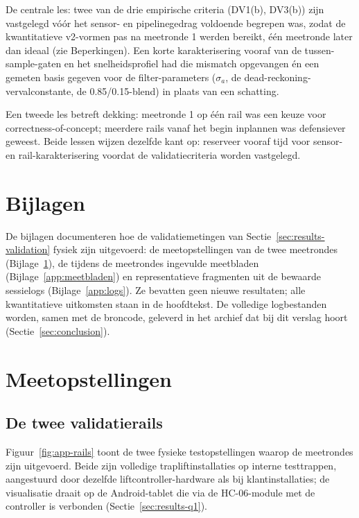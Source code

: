 \documentclass[10pt, a4paper, twocolumn]{article}
\begin{document}
De centrale les: twee van de drie empirische criteria (DV1(b), DV3(b)) zijn
vastgelegd vóór het sensor- en pipelinegedrag voldoende begrepen was, zodat de
kwantitatieve v2-vormen pas na meetronde 1 werden bereikt, één meetronde later dan
ideaal (zie Beperkingen). Een korte karakterisering vooraf van de
tussen-sample-gaten en het snelheidsprofiel had die mismatch opgevangen én een
gemeten basis gegeven voor de filter-parameters ($\sigma_a$, de
dead-reckoning-vervalconstante, de 0.85/0.15-blend) in plaats van een schatting.

Een tweede les betreft dekking: meetronde 1 op één rail was een keuze voor
correctness-of-concept; meerdere rails vanaf het begin inplannen was defensiever
geweest. Beide lessen wijzen dezelfde kant op: reserveer vooraf tijd voor sensor-
en rail-karakterisering voordat de validatiecriteria worden vastgelegd.

\clearpage



\clearpage
\onecolumn
\appendix

\section*{Bijlagen}
De bijlagen documenteren hoe de validatiemetingen van
Sectie~\ref{sec:results-validation} fysiek zijn uitgevoerd: de meetopstellingen
van de twee meetrondes (Bijlage~\ref{app:opstellingen}), de tijdens de meetrondes
ingevulde meetbladen (Bijlage~\ref{app:meetbladen}) en representatieve
fragmenten uit de bewaarde sessielogs (Bijlage~\ref{app:logs}). Ze bevatten
geen nieuwe resultaten; alle kwantitatieve uitkomsten staan in de hoofdtekst.
De volledige logbestanden worden, samen met de broncode, geleverd in het
archief dat bij dit verslag hoort (Sectie~\ref{sec:conclusion}).

% 
\section{Meetopstellingen}
\label{app:opstellingen}

\subsection{De twee validatierails}
Figuur~\ref{fig:app-rails} toont de twee fysieke testopstellingen waarop de
meetrondes zijn uitgevoerd. Beide zijn volledige trapliftinstallaties op
interne testtrappen, aangestuurd door dezelfde liftcontroller-hardware als bij
klantinstallaties; de visualisatie draait op de Android-tablet die via de
HC-06-module met de controller is verbonden (Sectie~\ref{sec:results-q1}).
\end{document}
